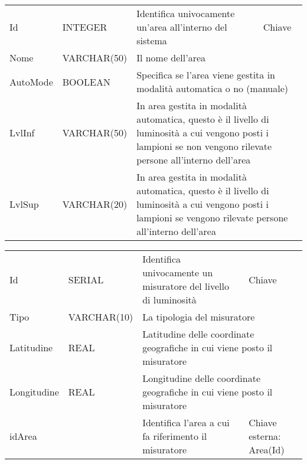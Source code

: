 \begin{center}
    \begin{tabularx}{\textwidth}{|l|l|l|X|}
        \hline
        \rowcolor{gray!30}
        \multicolumn{4}{|c|}{\textbf{AREA}}\\
        \hline
        Id & INTEGER & Identifica univocamente un'area all'interno del sistema & Chiave\\
        \hline
        Nome & VARCHAR(50) & \multicolumn{2}{l|}{Il nome dell'area} \\
        \hline
        AutoMode & BOOLEAN & \multicolumn{2}{l|}{Specifica se l'area viene gestita in modalità automatica o no (manuale)} \\
        \hline
        LvlInf & VARCHAR(50) & \multicolumn{2}{l|}{In area gestita in modalità automatica, questo è il livello di luminosità a cui vengono posti i lampioni se non vengono rilevate persone all'interno dell'area} \\
        \hline
        LvlSup & VARCHAR(20) & \multicolumn{2}{l|}{In area gestita in modalità automatica, questo è il livello di luminosità a cui vengono posti i lampioni se vengono rilevate persone all'interno dell'area} \\
        \hline
    \end{tabularx}
\end{center}

\begin{center}
    \begin{tabularx}{\textwidth}{|l|l|l|X|}
        \hline
        \rowcolor{gray!30}
        \multicolumn{4}{|c|}{\textbf{MISURATORE}}\\
        \hline
        Id & SERIAL & Identifica univocamente un misuratore del livello di luminosità & Chiave\\
        \hline
        Tipo & VARCHAR(10) & \multicolumn{2}{l|}{La tipologia del misuratore} \\
        \hline
        Latitudine & REAL & \multicolumn{2}{l|}{Latitudine delle coordinate geografiche in cui viene posto il misuratore} \\
        \hline
        Longitudine & REAL & \multicolumn{2}{l|}{Longitudine delle coordinate geografiche in cui viene posto il misuratore} \\
        \hline
        idArea & & Identifica l'area a cui fa riferimento il misuratore & Chiave esterna: Area(Id)\\
        \hline
    \end{tabularx}
\end{center}

